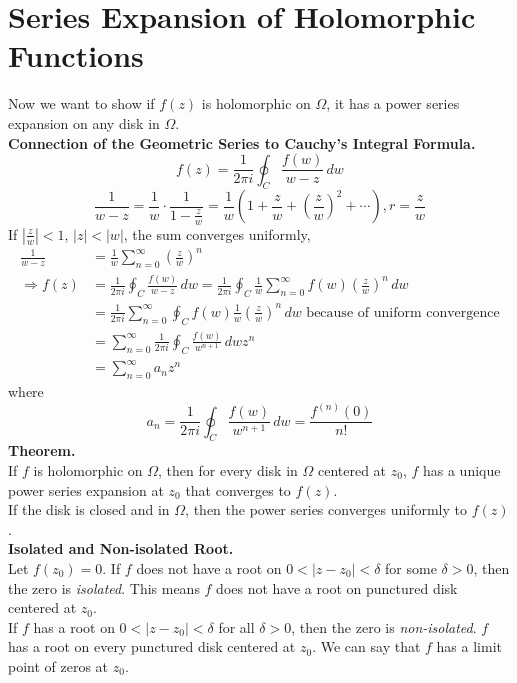 \documentclass[11pt]{article}
\begin{document}
\section{Series Expansion of Holomorphic Functions}
Now we want to show if $f(z)$ is holomorphic on $\Omega$, it has a power series expansion on any disk in $\Omega$. \\
\newline
\textbf{Connection of the Geometric Series to Cauchy's Integral Formula.} \\
$$f(z) = \frac{1}{2\pi i}\oint_C \frac{f(w)}{w - z} \,dw$$
$$\frac{1}{w - z} = \frac{1}{w} \cdot \frac{1}{1 - \frac{z}{w}} = \frac{1}{w} \left(1 + \frac{z}{w} + \left(\frac{z}{w}\right)^2 + \cdots \right), r = \frac{z}{w}$$
If $|\frac{z}{w}| < 1$, $|z| < |w|$, the sum converges uniformly, 
\begin{align*}
\frac{1}{w - z} &= \frac{1}{w}\sum_{n = 0}^{\infty}\left(\frac{z}{w}\right)^n \\
\Rightarrow f(z) &= \frac{1}{2\pi i}\oint_C \frac{f(w)}{w - z} \,dw = \frac{1}{2\pi i} \oint_C \frac{1}{w} \sum_{n = 0}^{\infty} f(w) \left(\frac{z}{w} \right)^n \,dw \\
&= \frac{1}{2\pi i}\sum_{n = 0}^{\infty} \oint_C f(w)\frac{1}{w}\left(\frac{z}{w}\right)^n \,dw \mbox{ because of uniform convergence} \\
&= \sum_{n = 0}^{\infty} \frac{1}{2\pi i}\oint_C \frac{f(w)}{w^{n + 1}}\,dw z^n \\
&= \sum_{n = 0}^{\infty}a_nz^n
\end{align*}
where 
$$a_n = \frac{1}{2\pi i}\oint_C\frac{f(w)}{w^{n + 1}}\, dw = \frac{f^{(n)}(0)}{n!}$$
\newline
\textbf{Theorem.} \\
If $f$ is holomorphic on $\Omega$, then for every disk in $\Omega$ centered at $z_0$, $f$ has a unique power series expansion at $z_0$ that converges to $f(z)$. \\
If the disk is closed and in $\Omega$, then the power series converges uniformly to $f(z)$. \\
\newline
\textbf{Isolated and Non-isolated Root. } \\
Let $f(z_0) = 0$. If $f$ does not have a root on $0 < |z - z_0| < \delta$ for some $\delta > 0$, then the zero is \textit{isolated}. This means $f$ does not have a root on punctured disk centered at $z_0$. \\
If $f$ has a root on $0 < |z - z_0| < \delta$ for all $\delta > 0$, then the zero is \textit{non-isolated}. $f$ has a root on every punctured disk centered at $z_0$. We can say that $f$ has a limit point of zeros at $z_0$. \\
\end{document}

